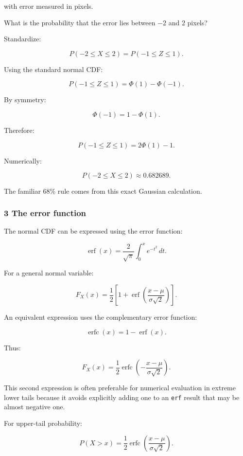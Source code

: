 with error measured in pixels.

What is the probability that the error lies between \(-2\) and \(2\) pixels?

Standardize:

\[
 P(-2\le X\le2) = P\left(-1\le Z\le1\right).
\]

Using the standard normal CDF:

\[
 P(-1\le Z\le1) = \Phi(1)-\Phi(-1).
\]

By symmetry:

\[
 \Phi(-1)=1-\Phi(1).
\]

Therefore:

\[
 P(-1\le Z\le1) = 2\Phi(1)-1.
\]

Numerically:

\[
 \boxed{P(-2\le X\le2)\approx0.682689}.
\]

The familiar 68\% rule comes from this exact Gaussian calculation.

\subsubsection{3 The error function}\label{02-foundations-ii-ch023-the-error-function}

\hypertarget{02-foundations-ii-ch023-the-error-function}{}

The normal CDF can be expressed using the error function:

\[
 \operatorname{erf}(x)= \frac2{\sqrt\pi} \int_0^xe^{-t^2}\,dt.
\]

For a general normal variable:

\[
 \boxed{ F_X(x) = \frac12\left[ 1+\operatorname{erf} \left(\frac{x-\mu}{\sigma\sqrt2}\right) \right] }.
\]

An equivalent expression uses the complementary error function:

\[
 \operatorname{erfc}(x)=1-\operatorname{erf}(x).
\]

Thus:

\[
 \boxed{ F_X(x) = \frac12\operatorname{erfc} \left( -\frac{x-\mu}{\sigma\sqrt2} \right) }.
\]

This second expression is often preferable for numerical evaluation in extreme lower tails because it avoids explicitly adding one to an \texttt{erf} result that may be almost negative one.

For upper-tail probability:

\[
 P(X>x) = \frac12\operatorname{erfc} \left( \frac{x-\mu}{\sigma\sqrt2} \right).
\]

